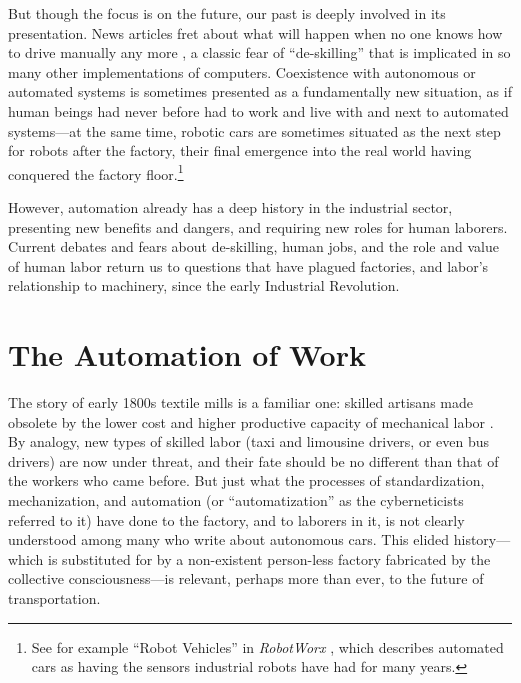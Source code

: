 But though the focus is on the future, our past is deeply involved
in its presentation. News articles fret
about what will happen when no one knows how to drive manually any
more \cite{pross}, a classic fear of ``de-skilling'' that is implicated in so many
other implementations of computers. Coexistence with
autonomous or automated systems is sometimes presented as a fundamentally new
situation, as if human beings had never before had to work and live
with and next to automated systems---at the same time, robotic cars
are sometimes situated as 
the next step for robots after the factory, their final emergence into
the real world having conquered the factory floor.\footnote{See for
  example ``Robot Vehicles'' in \emph{RobotWorx} \cite{robotworx}, which describes automated cars as having the sensors
  industrial robots have had for many years.} 

However,
automation already has a deep 
history in the industrial sector, presenting new benefits and
dangers, and requiring new roles for human laborers. Current debates
and fears about de-skilling, human jobs, 
and the role and value of human labor return us to questions that have
plagued factories, and labor's relationship to machinery, since the
early Industrial Revolution. 


\section{The Automation of Work}


The
story of early 1800s textile mills is a familiar one: skilled artisans made obsolete by the
lower cost and higher productive capacity of mechanical labor \cite{pewPositive}. By
analogy, new types of skilled labor (taxi and limousine drivers, or
even bus drivers) are now under threat, and their fate should be no
different than that of the workers who came before. But just what the
processes of standardization, mechanization, and automation (or
``automatization'' as the cyberneticists referred to it) have done to
the factory, and to laborers in it, is 
not clearly understood among many who write about autonomous cars. This
elided history---which is substituted for by a non-existent person-less
factory fabricated by the collective consciousness---is relevant, perhaps
more than ever, to the future of transportation.

